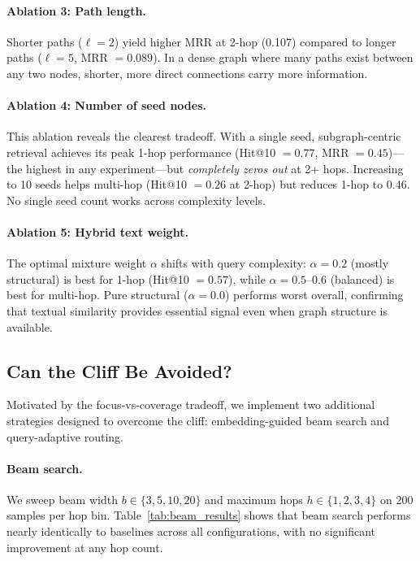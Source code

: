 \documentclass[11pt]{article}
\begin{document}
\paragraph{Ablation 3: Path length.} Shorter paths ($\ell = 2$) yield higher MRR at 2-hop (0.107) compared to longer paths ($\ell = 5$, MRR $= 0.089$). In a dense graph where many paths exist between any two nodes, shorter, more direct connections carry more information.

\paragraph{Ablation 4: Number of seed nodes.} This ablation reveals the clearest tradeoff. With a single seed, subgraph-centric retrieval achieves its peak 1-hop performance (Hit@10 $= 0.77$, MRR $= 0.45$)---the highest in any experiment---but \textit{completely zeros out} at 2+ hops. Increasing to 10 seeds helps multi-hop (Hit@10 $= 0.26$ at 2-hop) but reduces 1-hop to 0.46. No single seed count works across complexity levels.

\paragraph{Ablation 5: Hybrid text weight.} The optimal mixture weight $\alpha$ shifts with query complexity: $\alpha = 0.2$ (mostly structural) is best for 1-hop (Hit@10 $= 0.57$), while $\alpha = 0.5$--$0.6$ (balanced) is best for multi-hop. Pure structural ($\alpha = 0.0$) performs worst overall, confirming that textual similarity provides essential signal even when graph structure is available.

\subsection{Can the Cliff Be Avoided?}

Motivated by the focus-vs-coverage tradeoff, we implement two additional strategies designed to overcome the cliff: embedding-guided beam search and query-adaptive routing.

\paragraph{Beam search.} We sweep beam width $b \in \{3, 5, 10, 20\}$ and maximum hops $h \in \{1, 2, 3, 4\}$ on 200 samples per hop bin. Table~\ref{tab:beam_results} shows that beam search performs nearly identically to baselines across all configurations, with no significant improvement at any hop count.
\end{document}

